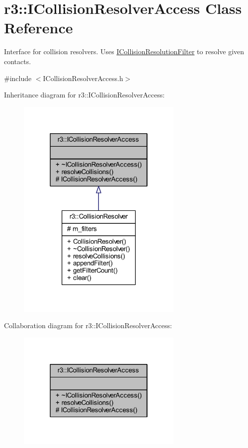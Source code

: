 \hypertarget{classr3_1_1_i_collision_resolver_access}{}\section{r3\+:\+:I\+Collision\+Resolver\+Access Class Reference}
\label{classr3_1_1_i_collision_resolver_access}


Interface for collision resolvers. Uses \mbox{\hyperlink{classr3_1_1_i_collision_resolution_filter}{I\+Collision\+Resolution\+Filter}} to resolve given contacts.  




{\ttfamily \#include $<$I\+Collision\+Resolver\+Access.\+h$>$}



Inheritance diagram for r3\+:\+:I\+Collision\+Resolver\+Access\+:\nopagebreak
\begin{figure}[H]
\begin{center}
\leavevmode
\includegraphics[width=226pt]{classr3_1_1_i_collision_resolver_access__inherit__graph}
\end{center}
\end{figure}


Collaboration diagram for r3\+:\+:I\+Collision\+Resolver\+Access\+:\nopagebreak
\begin{figure}[H]
\begin{center}
\leavevmode
\includegraphics[width=226pt]{classr3_1_1_i_collision_resolver_access__coll__graph}
\end{center}
\end{figure}
